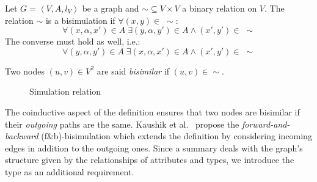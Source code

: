 \begin{definition}[Bisimulation]
Let $G=\left\langle V, A, l_V \right\rangle$ be a graph and $\sim \subseteq V \times V$ a binary relation on $V$.
The relation $\sim$ is a bisimulation if $\forall (x,y) \in\; \sim$:
\begin{equation*}
\forall (x, \alpha, x') \in A\; \exists (y, \alpha, y') \in A \wedge (x',y') \in\; \sim
\label{eq:b1}
\end{equation*}
The converse must hold as well, i.e.:
\begin{equation*}
\forall (y, \alpha, y') \in A\; \exists (x, \alpha, x') \in A \wedge (x',y') \in\; \sim
\label{eq:b2}
\end{equation*}
\end{definition}

\begin{remark}
Two nodes $(u, v) \in V^2$ are said \emph{bisimilar} if $(u, v) \in \sim$.
\end{remark}

\begin{figure}
	\centering
	\caption{Simulation relation}
	\label{fig:bisimulation}	
\end{figure}

The coinductive aspect of the definition ensures that two nodes are bisimilar if their \emph{outgoing} paths are the same. Kaushik et al.~\cite{kaushik:2002:cib} propose the \emph{forward-and-backward} (f\&b)-bisimulation which extends the definition by considering incoming edges in addition to the outgoing ones. Since a summary deals with the graph's structure given by the relationships of attributes and types, we introduce the type as an additional requirement.

